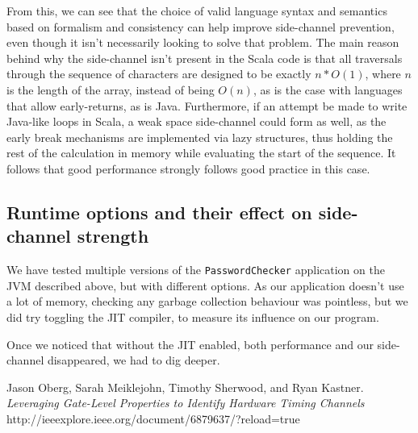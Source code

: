 \documentclass{article}
\begin{document}

From this, we can see that the choice of valid language syntax and semantics based on formalism and consistency can help improve side-channel prevention, even though it isn't necessarily looking to solve that problem. The main reason behind why the side-channel isn't present in the Scala code is that all traversals through the sequence of characters are designed to be exactly $n * O(1)$, where $n$ is the length of the array, instead of being $O(n)$, as is the case with languages that allow early-returns, as is Java. Furthermore, if an attempt be made to write Java-like loops in Scala, a weak space side-channel could form as well, as the early break mechanisms are implemented via lazy structures, thus holding the rest of the calculation in memory while evaluating the start of the sequence. It follows that good performance strongly follows good practice in this case.

\subsection{Runtime options and their effect on side-channel strength}

We have tested multiple versions of the \texttt{PasswordChecker} application on the JVM described above, but with different options. As our application doesn't use a lot of memory, checking any garbage collection behaviour was pointless, but we did try toggling the JIT compiler, to measure its influence on our program.


Once we noticed that without the JIT enabled, both performance and our side-channel disappeared, we had to dig deeper. %


\pagebreak
\begin{thebibliography}{9}
Jason Oberg, Sarah Meiklejohn, Timothy Sherwood, and Ryan Kastner.
\textit{Leveraging Gate-Level Properties to Identify Hardware Timing Channels}
http://ieeexplore.ieee.org/document/6879637/?reload=true
\end{thebibliography}
\end{document}
